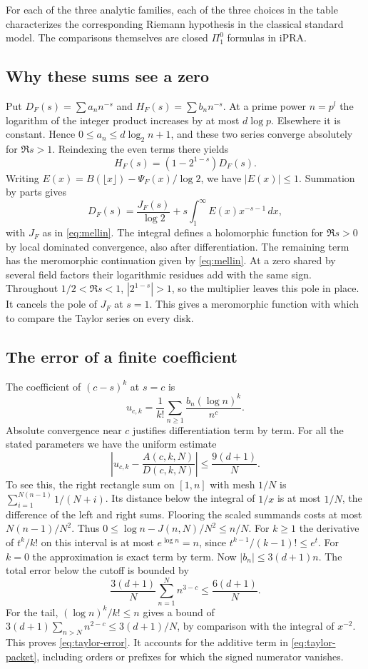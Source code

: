 \begin{theorem}\label{thm:taylor}
For each of the three analytic families, each of the three choices in the table characterizes the corresponding Riemann hypothesis in the classical standard model. The comparisons themselves are closed $\Pi^0_1$ formulas in iPRA.
\end{theorem}
\subsection*{Why these sums see a zero}
Put $D_F(s)=\sum a_n n^{-s}$ and $H_F(s)=\sum b_n n^{-s}$. At a prime power $n=p^l$ the logarithm of the integer product increases by at most $d\log p$. Elsewhere it is constant. Hence $0\le a_n\le d\log_2 n+1$, and these two series converge absolutely for $\Re s>1$. Reindexing the even terms there yields
\[
 H_F(s)=(1-2^{1-s})D_F(s).
\]
Writing $E(x)=B(\lfloor x\rfloor)-\Psi_F(x)/\log 2$, we have $|E(x)|\le1$. Summation by parts gives
\[
 D_F(s)=\frac{J_F(s)}{\log 2}
        +s\int_1^\infty E(x)x^{-s-1}\,dx ,
\]
with $J_F$ as in \eqref{eq:mellin}. The integral defines a holomorphic function for $\Re s>0$ by local dominated convergence, also after differentiation. The remaining term has the meromorphic continuation given by \eqref{eq:mellin}. At a zero shared by several field factors their logarithmic residues add with the same sign. Throughout $1/2<\Re s<1$, $|2^{1-s}|>1$, so the multiplier leaves this pole in place. It cancels the pole of $J_F$ at $s=1$. This gives a meromorphic function with which to compare the Taylor series on every disk.

\subsection*{The error of a finite coefficient}
The coefficient of $(c-s)^k$ at $s=c$ is
\[
 u_{c,k}=\frac{1}{k!}\sum_{n\ge1}\frac{b_n(\log n)^k}{n^c}.
\]
Absolute convergence near $c$ justifies differentiation term by term. For all the stated parameters we have the uniform estimate
\begin{equation}\label{eq:taylor-error}
 \left|u_{c,k}-\frac{A(c,k,N)}{D(c,k,N)}\right|\le\frac{9(d+1)}{N}.
\end{equation}
To see this, the right rectangle sum on $[1,n]$ with mesh $1/N$ is $\sum_{i=1}^{N(n-1)}1/(N+i)$. Its distance below the integral of $1/x$ is at most $1/N$, the difference of the left and right sums. Flooring the scaled summands costs at most $N(n-1)/N^2$. Thus $0\le\log n-J(n,N)/N^2\le n/N$. For $k\ge1$ the derivative of $t^k/k!$ on this interval is at most $e^{\log n}=n$, since $t^{k-1}/(k-1)!\le e^t$. For $k=0$ the approximation is exact term by term. Now $|b_n|\le3(d+1)n$. The total error below the cutoff is bounded by
\[
 \frac{3(d+1)}{N}\sum_{n=1}^N n^{3-c}\le\frac{6(d+1)}{N}.
\]
For the tail, $(\log n)^k/k!\le n$ gives a bound of $3(d+1)\sum_{n>N} n^{2-c}\le 3(d+1)/N$, by comparison with the integral of $x^{-2}$. This proves \eqref{eq:taylor-error}. It accounts for the additive term in \eqref{eq:taylor-packet}, including orders or prefixes for which the signed numerator vanishes.

